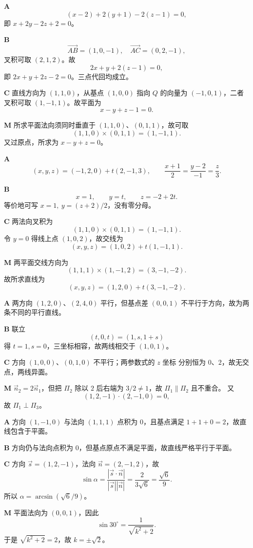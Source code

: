 \begin{solutionBox}
\textbf{A}\quad
\[
(x-2)+2(y+1)-2(z-1)=0,
\]
即 \(x+2y-2z+2=0\)。

\textbf{B}\quad
\[
\overrightarrow{AB}=(1,0,-1),\quad
\overrightarrow{AC}=(0,2,-1),
\]
叉积可取 \((2,1,2)\)。故
\[
2x+y+2(z-1)=0,
\]
即 \(2x+y+2z-2=0\)。三点代回均成立。

\textbf{C}\quad
直线方向为 \((1,1,0)\)，从基点 \((1,0,0)\) 指向 \(Q\) 的向量为
\((-1,0,1)\)，二者叉积可取 \((1,-1,1)\)。故平面为
\[
x-y+z-1=0.
\]

\textbf{M}\quad
所求平面法向须同时垂直于
\((1,1,0)\)、\((0,1,1)\)，故可取
\[
(1,1,0)\times(0,1,1)=(1,-1,1).
\]
又过原点，所求为 \(x-y+z=0\)。
\end{solutionBox}

\begin{solutionBox}
\textbf{A}\quad
\[
(x,y,z)=(-1,2,0)+t(2,-1,3),
\qquad
\frac{x+1}{2}=\frac{y-2}{-1}=\frac z3.
\]

\textbf{B}\quad
\[
x=1,\qquad y=t,\qquad z=-2+2t.
\]
等价地可写 \(x=1,\ y=(z+2)/2\)，没有零分母。

\textbf{C}\quad
两法向叉积为
\[
(1,1,0)\times(0,1,1)=(1,-1,1).
\]
令 \(y=0\) 得线上点 \((1,0,2)\)，故交线为
\[
(x,y,z)=(1,0,2)+t(1,-1,1).
\]

\textbf{M}\quad
两平面交线方向为
\[
(1,1,1)\times(1,-1,2)=(3,-1,-2).
\]
故所求直线为
\[
(x,y,z)=(1,2,0)+t(3,-1,-2).
\]
\end{solutionBox}

\begin{solutionBox}
\textbf{A}\quad
两方向 \((1,2,0)\)、\((2,4,0)\) 平行，但基点差
\((0,0,1)\) 不平行于方向，故为两条不同的平行直线。

\textbf{B}\quad
联立
\[
(t,0,t)=(1,s,1+s)
\]
得 \(t=1,s=0\)，三坐标相容，故两线相交于 \((1,0,1)\)。

\textbf{C}\quad
方向 \((1,0,0)\)、\((0,1,0)\) 不平行；两参数式的 \(z\) 坐标
分别恒为 \(0\)、\(2\)，故无交点，两线异面。

\textbf{M}\quad
\(\vec n_2=2\vec n_1\)，但把 \(\Pi_2\) 除以 \(2\) 后右端为
\(3/2\ne1\)，故 \(\Pi_1\parallel\Pi_2\) 且不重合。
又
\[
(1,2,-1)\cdot(2,-1,0)=0,
\]
故 \(\Pi_1\perp\Pi_3\)。
\end{solutionBox}

\begin{solutionBox}
\textbf{A}\quad
方向 \((1,-1,0)\) 与法向 \((1,1,1)\) 点积为 \(0\)，且基点满足
\(1+1+0=2\)，故直线包含于平面。

\textbf{B}\quad
方向仍与法向点积为 \(0\)，但基点原点不满足平面，故直线严格平行于平面。

\textbf{C}\quad
方向 \(\vec s=(1,2,-1)\)，法向 \(\vec n=(2,-1,2)\)，故
\[
\sin\alpha=\frac{|\vec s\cdot\vec n|}{|\vec s||\vec n|}
=\frac2{3\sqrt6}=\frac{\sqrt6}{9}.
\]
所以 \(\alpha=\arcsin(\sqrt6/9)\)。

\textbf{M}\quad
平面法向为 \((0,0,1)\)，因此
\[
\sin30^\circ=\frac1{\sqrt{k^2+2}}.
\]
于是 \(\sqrt{k^2+2}=2\)，故 \(k=\pm\sqrt2\)。
\end{solutionBox}

